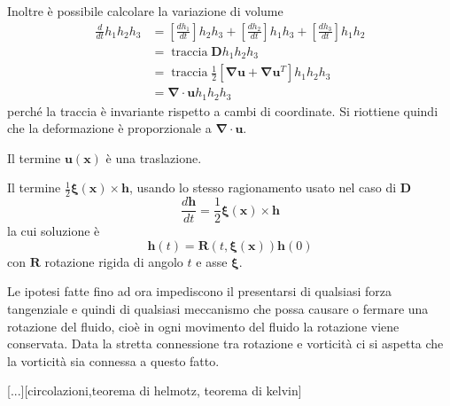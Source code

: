 \documentclass{book}
\newcommand{\Nabla}{\boldsymbol{\nabla}}
\DeclareMathOperator{\traccia}{traccia}
\begin{document}
Inoltre è possibile calcolare la variazione di volume
\begin{equation}
\begin{split}
\frac{d}{dt}h_1 h_2 h_3 &= \left [ \frac{dh_1}{dt} \right ] h_2h_3 + \left [ \frac{dh_2}{dt} \right ] h_1h_3 + \left [ \frac{dh_3}{dt} \right ] h_1h_2 \\
                                        &= \traccia \mathbf{D} h_1 h_2 h_3  \\
                                        &= \traccia  \frac{1}{2} [ \Nabla\mathbf{u} + \Nabla\mathbf{u} ^T] h_1 h_2 h_3 \\ 
                                        &= \Nabla \cdot \mathbf{u} h_1 h_2 h_3
\end{split}
\end{equation}
perché la traccia è invariante rispetto a cambi di coordinate. Si riottiene quindi che la deformazione è proporzionale a $ \Nabla \cdot \mathbf{u}$.

Il termine $\mathbf{u}(\mathbf{x})$ è una traslazione.

Il termine $\frac{1}{2}\boldsymbol{\xi}(\mathbf{x})\times\mathbf{h}$, usando lo stesso ragionamento usato nel caso di $\mathbf{D}$
$$\frac{d\mathbf{h}}{dt}=\frac{1}{2}\boldsymbol{\xi}(\mathbf{x})\times\mathbf{h}$$
la cui soluzione è
$$\mathbf{h}(t)=\mathbf{R}(t,\boldsymbol{\xi}(\mathbf{x}))\mathbf{h}(0)$$
con $\mathbf{R}$ rotazione rigida di angolo $t$ e asse $\boldsymbol{\xi}$. 

Le ipotesi fatte fino ad ora impediscono il presentarsi di qualsiasi forza tangenziale e quindi di qualsiasi meccanismo che possa causare o fermare una rotazione del fluido, cioè in ogni movimento del fluido la rotazione viene conservata. Data la stretta connessione tra rotazione e vorticità ci si aspetta che la vorticità sia connessa a questo fatto. 

[...][circolazioni,teorema di helmotz, teorema di kelvin]
\end{document}
